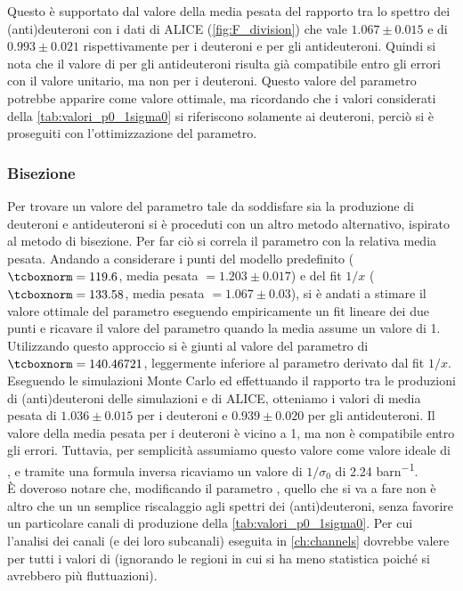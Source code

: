 Questo è supportato dal valore della media pesata del rapporto tra lo spettro dei (anti)deuteroni con i dati di ALICE (\autoref{fig:F_division}) che vale $1.067 \pm 0.015$ e di $0.993 \pm 0.021$ rispettivamente per i deuteroni e per gli antideuteroni. Quindi si nota che il valore di  per gli antideuteroni risulta già compatibile entro gli errori con il valore unitario, ma non per i deuteroni.
Questo valore del parametro potrebbe apparire come valore  ottimale, ma ricordando che i valori considerati della \autoref{tab:valori_p0_1sigma0} si riferiscono solamente ai deuteroni, perciò si è proseguiti con l'ottimizzazione del parametro.

\subsubsection{Bisezione}
Per trovare un valore del parametro  tale da soddisfare sia la produzione di deuteroni e antideuteroni si è proceduti con un altro metodo alternativo, ispirato al metodo di bisezione.
Per far ciò si correla il parametro  con la relativa media pesata.
Andando a considerare i punti del modello predefinito ($\ttbox{norm} = 119.6$, media pesata $= 1.203 \pm 0.017$) e del fit $1/x$ ($\ttbox{norm} = 133.58$, media pesata $= 1.067 \pm 0.03$), si è andati a stimare il valore ottimale del parametro eseguendo empiricamente un fit lineare dei due punti e ricavare il valore del parametro quando la media assume un valore di 1.
Utilizzando questo approccio si è giunti al valore del parametro di $\ttbox{norm} = 140.46721$, leggermente inferiore al parametro derivato dal fit $1/x$.
Eseguendo le simulazioni Monte Carlo ed effettuando il rapporto tra le produzioni di (anti)deuteroni delle simulazioni e di ALICE, otteniamo i valori di media pesata di $1.036 \pm 0.015$ per i deuteroni e $ 0.939 \pm 0.020$ per gli antideuteroni.
Il valore della media pesata per i deuteroni è vicino a 1, ma non è compatibile entro gli errori.
Tuttavia, per semplicità assumiamo questo valore come valore ideale di , e tramite una formula inversa ricaviamo un valore di $1/\sigma_0$ di 2.24 \si{barn^{-1}}.\\

È doveroso notare che, modificando il parametro , quello che si va a fare non è altro che un un semplice riscalaggio agli spettri dei (anti)deuteroni, senza favorire un particolare canali di produzione della \autoref{tab:valori_p0_1sigma0}.
Per cui l'analisi dei canali (e dei loro subcanali) eseguita in \autoref{ch:channels} dovrebbe valere per tutti i valori di  (ignorando le regioni in cui si ha meno statistica poiché si avrebbero più fluttuazioni). 